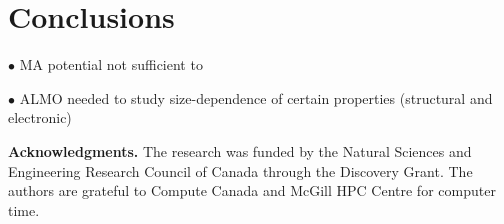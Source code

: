 \documentclass[aps,prb,twocolumn,amsmath,amssymb,superscriptaddress,longbibliography]{revtex4-1}
\begin{document}
\section*{Conclusions} 

$\bullet$ MA potential not sufficient to 

$\bullet$ ALMO needed to study size-dependence of certain properties (structural and electronic)



\textbf{Acknowledgments.} The research was funded by the Natural Sciences and Engineering Research Council of Canada through the Discovery Grant. The authors are grateful to Compute Canada and McGill HPC Centre for computer time.



\end{document}
